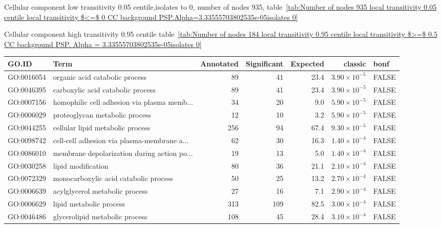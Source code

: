 Cellular component low transitivity 0.05 centile,isolates to 0, number of nodes 935, table~\ref{tab:Number of nodes 935 local transitivity 0.05 centile  local transitivity $<=$ 0 CC background PSP.Alpha=3.33555703802535e-05isolates 0}

Cellular component high transitivity 0.95 centile table~\ref{tab:Number of nodes 184 local transitivity 0.95 centile  local transitivity $>=$ 0.5 CC background PSP. Alpha = 3.33555703802535e-05isolates 0}


\begin{table}[ht]
\centering
\begin{adjustbox}{max width=\textwidth}
\begin{tabular}{llrrrrl}
  \hline
GO.ID & Term & Annotated & Significant & Expected & classic & bonf \\ 
  \hline
GO:0016054 & organic acid catabolic process & 89 & 41 & 23.4 & $3.90 \times 10^{-5}$ & FALSE \\ 
  GO:0046395 & carboxylic acid catabolic process & 89 & 41 & 23.4 & $3.90 \times 10^{-5}$ & FALSE \\ 
  GO:0007156 & homophilic cell adhesion via plasma memb... & 34 & 20 & 9.0 & $5.90 \times 10^{-5}$ & FALSE \\ 
  GO:0006029 & proteoglycan metabolic process & 12 & 10 & 3.2 & $5.90 \times 10^{-5}$ & FALSE \\ 
  GO:0044255 & cellular lipid metabolic process & 256 & 94 & 67.4 & $9.30 \times 10^{-5}$ & FALSE \\ 
  GO:0098742 & cell-cell adhesion via plasma-membrane a... & 62 & 30 & 16.3 & $1.40 \times 10^{-4}$ & FALSE \\ 
  GO:0086010 & membrane depolarization during action po... & 19 & 13 & 5.0 & $1.40 \times 10^{-4}$ & FALSE \\ 
  GO:0030258 & lipid modification & 80 & 36 & 21.1 & $2.10 \times 10^{-4}$ & FALSE \\ 
  GO:0072329 & monocarboxylic acid catabolic process & 50 & 25 & 13.2 & $2.70 \times 10^{-4}$ & FALSE \\ 
  GO:0006639 & acylglycerol metabolic process & 27 & 16 & 7.1 & $2.90 \times 10^{-4}$ & FALSE \\ 
  GO:0006629 & lipid metabolic process & 313 & 109 & 82.5 & $3.00 \times 10^{-4}$ & FALSE \\ 
  GO:0046486 & glycerolipid metabolic process & 108 & 45 & 28.4 & $3.10 \times 10^{-4}$ & FALSE \\ 

\end{tabular}
\end{adjustbox}
\end{table}

